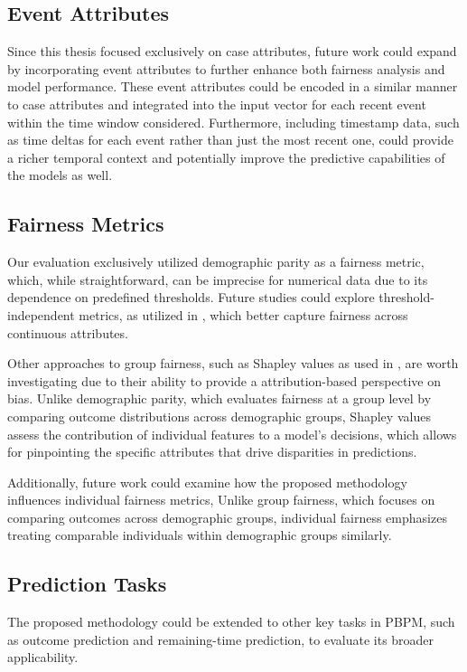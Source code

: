 \subsection*{Event Attributes}
Since this thesis focused exclusively on case attributes,
future work could expand by incorporating event attributes to further enhance both fairness analysis and model performance.
These event attributes could be encoded in a similar manner to case attributes
and integrated into the input vector for each recent event within the time window considered.
Furthermore, including timestamp data, such as time deltas for each event rather than just the most recent one,
could provide a richer temporal context and potentially improve the predictive capabilities of the models as well.

\subsection*{Fairness Metrics}
Our evaluation exclusively utilized demographic parity as a fairness metric, which, while straightforward,
can be imprecise for numerical data due to its dependence on predefined thresholds.
Future studies could explore threshold-independent metrics,
as utilized in \cite{fairness_independence}, which better capture fairness across continuous attributes.

Other approaches to group fairness, such as Shapley values \cite{shapley} as used in \cite{fairness_adversarial},
are worth investigating due to their ability to provide a attribution-based perspective on bias.
Unlike demographic parity, which evaluates fairness at a group level by comparing outcome distributions across demographic groups,
Shapley values assess the contribution of individual features to a model's decisions,
which allows for pinpointing the specific attributes that drive disparities in predictions.

Additionally, future work could examine how the proposed methodology influences individual fairness metrics,
Unlike group fairness, which focuses on comparing outcomes across demographic groups,
individual fairness emphasizes treating comparable individuals within demographic groups similarly.

\subsection*{Prediction Tasks}
The proposed methodology could be extended to other key tasks in PBPM,
such as outcome prediction and remaining-time prediction, to evaluate its broader applicability.

